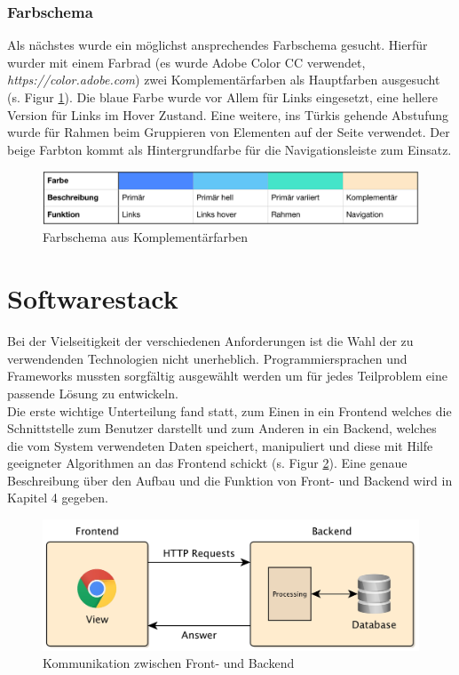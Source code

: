 \subsubsection{Farbschema}

Als nächstes wurde ein möglichst ansprechendes Farbschema gesucht. Hierfür wurder mit einem Farbrad (es wurde Adobe Color CC verwendet, \textit{https://color.adobe.com}) zwei Komplementärfarben als Hauptfarben ausgesucht (s. Figur \ref{fig:colors}). Die blaue Farbe wurde vor Allem für Links eingesetzt, eine hellere Version für Links im Hover Zustand. Eine weitere, ins Türkis gehende Abstufung wurde für Rahmen beim Gruppieren von Elementen auf der Seite verwendet. Der beige Farbton kommt als Hintergrundfarbe für die Navigationsleiste zum Einsatz.

\begin{figure}[h!]
	\centering
	\includegraphics[width=.95\linewidth]{figures/farbschema}
	\caption{Farbschema aus Komplementärfarben}
	\label{fig:colors}
\end{figure}






\section{Softwarestack}

Bei der Vielseitigkeit der verschiedenen Anforderungen ist die Wahl der zu verwendenden Technologien nicht unerheblich. Programmiersprachen und Frameworks mussten sorgfältig ausgewählt werden um für jedes Teilproblem eine passende Lösung zu entwickeln.\\
Die erste wichtige Unterteilung fand statt, zum Einen in ein Frontend welches die Schnittstelle zum Benutzer darstellt und zum Anderen in ein Backend, welches die vom System verwendeten Daten speichert, manipuliert und diese mit Hilfe geeigneter Algorithmen an das Frontend schickt (s. Figur \ref{fig:frontendbackend}). Eine genaue Beschreibung über den Aufbau und die Funktion von Front- und Backend wird in Kapitel 4 gegeben.\\

\begin{figure}[h!]
	\centering
	\includegraphics[width=.8\linewidth]{figures/frontendbackend}
	\caption{Kommunikation zwischen Front- und Backend}
	\label{fig:frontendbackend}
\end{figure}

